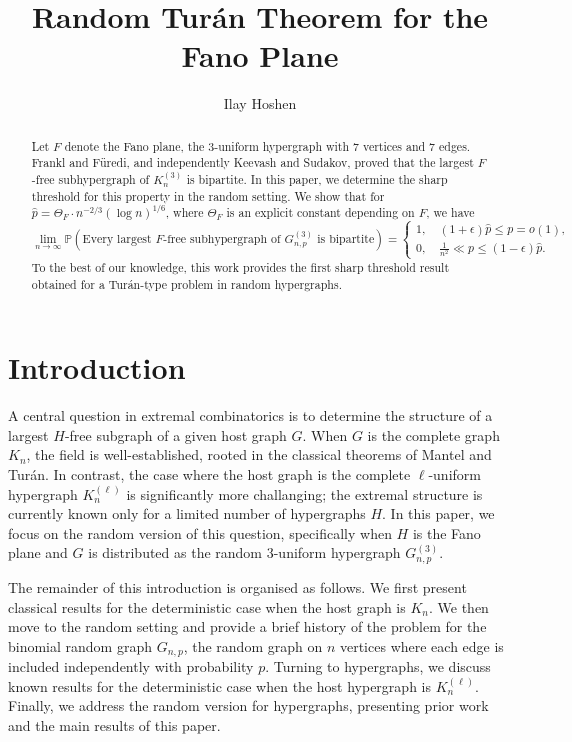 \documentclass[11pt,a4paper,oneside,reqno]{amsart}
\author{Ilay Hoshen}
\title{Random Tur\'an Theorem for the Fano Plane}
\newcommand{\Gnp}{G_{n, p}^{(3)}}
\newcommand{\1}{\mathbbm{1}} %
\renewcommand{\le}{\leqslant}
\begin{document}
\begin{abstract}
    Let $F$ denote the Fano plane, the $3$-uniform hypergraph with $7$ vertices and $7$ edges. Frankl and F\"uredi, and independently Keevash and Sudakov, proved that the largest $F$-free subhypergraph of $K_n^{(3)}$ is bipartite. In this paper, we determine the sharp threshold for this property in the random setting. We show that for $\hat{p} = \Theta_F \cdot n^{-2/3} \left(\log n\right)^{1/6}$, where $\Theta_F$ is an explicit constant depending on $F$, we have
    \[
        \lim_{n \to\infty} \mathbb{P}\left(\text{Every largest $F$-free subhypergraph of $\Gnp$ is bipartite}\right) = \begin{cases}
            1, \quad (1+\epsilon) \hat{p} \le p = o(1), \\
            0, \quad \frac{1}{n^2} \ll p \le (1-\epsilon) \hat{p}.
        \end{cases}
    \]
    To the best of our knowledge, this work provides the first sharp threshold result obtained for a Turán-type problem in random hypergraphs.
\end{abstract}

\maketitle

\setcounter{tocdepth}{1}
\tableofcontents

\section{Introduction}
A central question in extremal combinatorics is to determine the structure of a largest $H$-free subgraph of a given host graph $G$. 
When $G$ is the complete graph $K_n$, the field is well-established, rooted in the classical theorems of Mantel and Tur\'an. 
In contrast, the case where the host graph is the complete $\ell$-uniform hypergraph $K_n^{(\ell)}$ is significantly more challanging; the extremal structure is currently known only for a limited number of hypergraphs $H$. 
In this paper, we focus on the random version of this question, specifically when $H$ is the Fano plane and $G$ is distributed as the random $3$-uniform hypergraph $G_{n, p}^{(3)}$.

The remainder of this introduction is organised as follows. 
We first present classical results for the deterministic case when the host graph is $K_n$. 
We then move to the random setting and provide a brief history of the problem for the binomial random graph $G_{n, p}$, the random graph on $n$ vertices where each edge is included independently with probability $p$. 
Turning to hypergraphs, we discuss known results for the deterministic case when the host hypergraph is $K_n^{(\ell)}$.
Finally, we address the random version for hypergraphs, presenting prior work and the main results of this paper.
\end{document}
